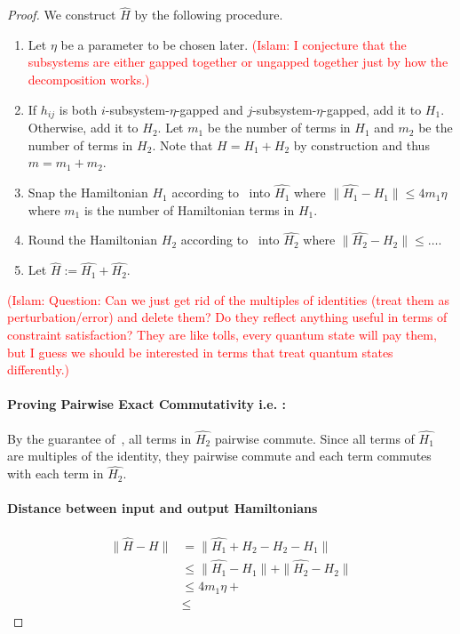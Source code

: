 \documentclass[11pt]{article}
\theoremstyle{plain}
\newcommand{\IslamNote}[1]{\textcolor{red}{(Islam: #1)}}
\newcommand{\IslamNote}[1]{}
\begin{document}
\begin{proof}
We construct $\widehat{H}$ by the following procedure.
\begin{enumerate}
    \item Let $\eta$ be a parameter to be chosen later.
    \IslamNote{I conjecture that the subsystems are either gapped together or ungapped together just by how the decomposition works.}
    \item If $h_{ij}$ is both $i$-subsystem-$\eta$-gapped and $j$-subsystem-$\eta$-gapped, add it to $H_1$. Otherwise, add it to $H_2$. Let $m_1$ be the number of terms in $H_1$ and $m_2$ be the number of terms in $H_2$. Note that $H = H_1 + H_2$ by construction and thus $m = m_1 + m_2$.
    \item Snap the Hamiltonian $H_1$ according to~ into $\widehat{H_1}$ where $\|\widehat{H_1} - H_1\| \leq 4 m_1 \eta$ where $m_1$ is the number of Hamiltonian terms in $H_1$.
    \item Round the Hamiltonian $H_2$ according to~ into $\widehat{H_2}$ where $\|\widehat{H_2} - H_2\| \leq \dots $.
    \item Let $\widehat{H} := \widehat{H_1} + \widehat{H_2}$.
\end{enumerate}

\IslamNote{Question: Can we just get rid of the multiples of identities (treat them as perturbation/error) and delete them? Do they reflect anything useful in terms of constraint satisfaction? They are like tolls, every quantum state will pay them, but I guess we should be interested in terms that treat quantum states differently.}

\paragraph{Proving Pairwise Exact Commutativity i.e. :} By the guarantee of~, all terms in $\widehat{H_2}$ pairwise commute. Since all terms of $\widehat{H_1}$ are multiples of the identity, they pairwise commute and each term commutes with each term in $\widehat{H_2}$.


\paragraph{Distance between input and output Hamiltonians}
\begin{align*}
    \|\widehat{H} - H\| &= \|\widehat{H_1} + \widehat{H_2} - H_2 - H_1\|\\
    &\leq \|\widehat{H_1} - H_1\| + \|\widehat{H_2} - H_2\|\\
    & \leq 4 m_1 \eta + \\
    & \leq 
\end{align*}


\end{proof}
\end{document}
